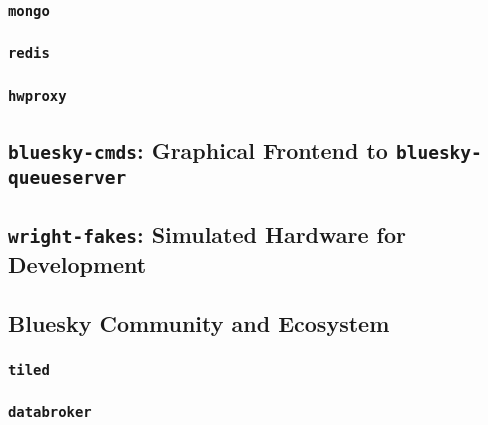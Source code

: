 \subsubsection{\texttt{mongo}}
\subsubsection{\texttt{redis}}
\subsubsection{\texttt{hwproxy}}

\subsection{\texttt{bluesky-cmds}: Graphical Frontend to \texttt{bluesky-queueserver}}

\subsection{\texttt{wright-fakes}: Simulated Hardware for Development}

\subsection{Bluesky Community and Ecosystem}
\subsubsection{\texttt{tiled}}
\subsubsection{\texttt{databroker}}

\clearpage
